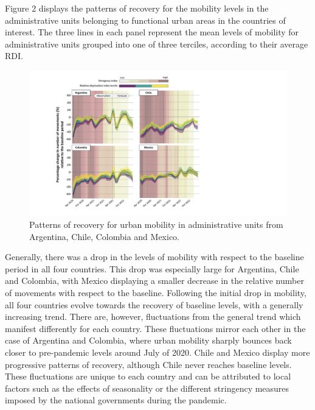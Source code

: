 \documentclass[
  11pt,
]{article}
\begin{document}
Figure 2 displays the patterns of recovery for the mobility levels in
the administrative units belonging to functional urban areas in the
countries of interest. The three lines in each panel represent the mean
levels of mobility for administrative units grouped into one of three
terciles, according to their average RDI.

\begin{figure}[H]

{\centering \includegraphics{figures/prediction-rdi-band.pdf}

}

\caption{Patterns of recovery for urban mobility in administrative units
from Argentina, Chile, Colombia and Mexico.}

\end{figure}%

Generally, there was a drop in the levels of mobility with respect to
the baseline period in all four countries. This drop was especially
large for Argentina, Chile and Colombia, with Mexico displaying a
smaller decrease in the relative number of movements with respect to the
baseline. Following the initial drop in mobility, all four countries
evolve towards the recovery of baseline levels, with a generally
increasing trend. There are, however, fluctuations from the general
trend which manifest differently for each country. These fluctuations
mirror each other in the case of Argentina and Colombia, where urban
mobility sharply bounces back closer to pre-pandemic levels around July
of 2020. Chile and Mexico display more progressive patterns of recovery,
although Chile never reaches baseline levels. These fluctuations are
unique to each country and can be attributed to local factors such as
the effects of seasonality or the different stringency measures imposed
by the national governments during the pandemic.
\end{document}
